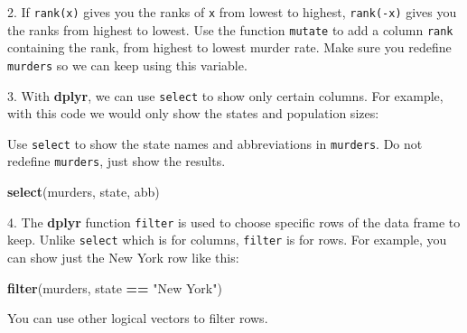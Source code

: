\documentclass[
]{krantz}
\newenvironment{Shaded}{\begin{snugshade}}{\end{snugshade}}
\newcommand{\DataTypeTok}[1]{\textcolor[rgb]{0.27,0.27,0.27}{#1}}
\newcommand{\KeywordTok}[1]{\textcolor[rgb]{0.27,0.27,0.27}{\textbf{#1}}}
\newcommand{\NormalTok}[1]{#1}
\newcommand{\OperatorTok}[1]{\textcolor[rgb]{0.43,0.43,0.43}{\textbf{#1}}}
\newcommand{\StringTok}[1]{\textcolor[rgb]{0.5,0.5,0.5}{#1}}
\begin{document}
2. If \texttt{rank(x)} gives you the ranks of \texttt{x} from lowest to highest, \texttt{rank(-x)} gives you the ranks from highest to lowest. Use the function \texttt{mutate} to add a column \texttt{rank} containing the rank, from highest to lowest murder rate. Make sure you redefine \texttt{murders} so we can keep using this variable.

\begin{Shaded}
\end{Shaded}

3. With \textbf{dplyr}, we can use \texttt{select} to show only certain columns. For example, with this code we would only show the states and population sizes:

\begin{Shaded}
\end{Shaded}

Use \texttt{select} to show the state names and abbreviations in \texttt{murders}. Do not redefine \texttt{murders}, just show the results.

\begin{Shaded}
\begin{Highlighting}[]
\KeywordTok{select}\NormalTok{(murders, state, abb)}
\end{Highlighting}
\end{Shaded}

4. The \textbf{dplyr} function \texttt{filter} is used to choose specific rows of the data frame to keep. Unlike \texttt{select} which is for columns, \texttt{filter} is for rows. For example, you can show just the New York row like this:

\begin{Shaded}
\begin{Highlighting}[]
\KeywordTok{filter}\NormalTok{(murders, state }\OperatorTok{==}\StringTok{ "New York"}\NormalTok{)}
\end{Highlighting}
\end{Shaded}

You can use other logical vectors to filter rows.
\end{document}

